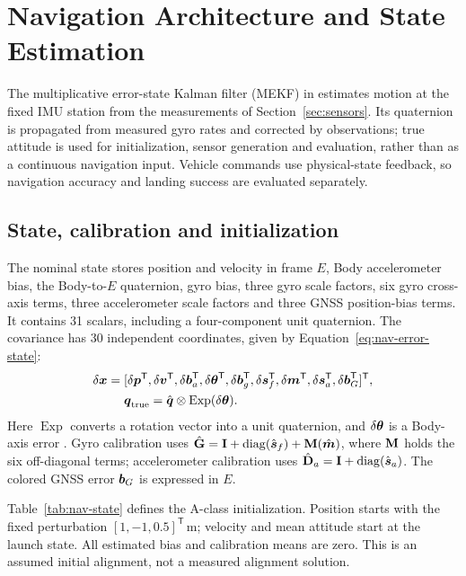 \section{Navigation Architecture and State Estimation}
\label{sec:navigation}

The multiplicative error-state Kalman filter (MEKF) in  estimates motion at the fixed IMU station from the measurements of Section~\ref{sec:sensors}. Its quaternion is propagated from measured gyro rates and corrected by observations; true attitude is used for initialization, sensor generation and evaluation, rather than as a continuous navigation input. Vehicle commands use physical-state feedback, so navigation accuracy and landing success are evaluated separately.

\subsection{State, calibration and initialization}
The nominal state stores position and velocity in frame $E$, Body accelerometer bias, the Body-to-$E$ quaternion, gyro bias, three gyro scale factors, six gyro cross-axis terms, three accelerometer scale factors and three GNSS position-bias terms. It contains 31 scalars, including a four-component unit quaternion. The covariance has 30 independent coordinates, given by Equation~\eqref{eq:nav-error-state}:
\begin{equation}
\begin{aligned}
 \delta\boldsymbol{x}={}&[\delta\boldsymbol{p}^{\mathsf T},\delta\boldsymbol{v}^{\mathsf T},\delta\boldsymbol{b}_a^{\mathsf T},
 \delta\boldsymbol{\theta}^{\mathsf T},\delta\boldsymbol{b}_g^{\mathsf T},\delta\boldsymbol{s}_f^{\mathsf T},
 \delta\boldsymbol{m}^{\mathsf T},\delta\boldsymbol{s}_a^{\mathsf T},\delta\boldsymbol{b}_G^{\mathsf T}]^{\mathsf T},\\
 &\boldsymbol{q}_{\mathrm{true}}=\hat{\boldsymbol{q}}\otimes\operatorname{Exp}(\delta\boldsymbol{\theta}).
\end{aligned}
\label{eq:nav-error-state}
\end{equation}
Here $\operatorname{Exp}$ converts a rotation vector into a unit quaternion, and $\delta\boldsymbol{\theta}$ is a Body-axis error \cite{sola2017}. Gyro calibration uses $\hat{\mathbf{G}}=\mathbf{I}+\operatorname{diag}(\hat{\boldsymbol{s}}_f)+\mathbf{M}(\hat{\boldsymbol{m}})$, where $\mathbf{M}$ holds the six off-diagonal terms; accelerometer calibration uses $\hat{\mathbf{D}}_a=\mathbf{I}+\operatorname{diag}(\hat{\boldsymbol{s}}_a)$. The colored GNSS error $\boldsymbol{b}_G$ is expressed in $E$.

Table~\ref{tab:nav-state} defines the A-class initialization. Position starts with the fixed perturbation $[1,-1,0.5]^{\mathsf T}\,\mathrm{m}$; velocity and mean attitude start at the launch state. All estimated bias and calibration means are zero. This is an assumed initial alignment, not a measured alignment solution.

